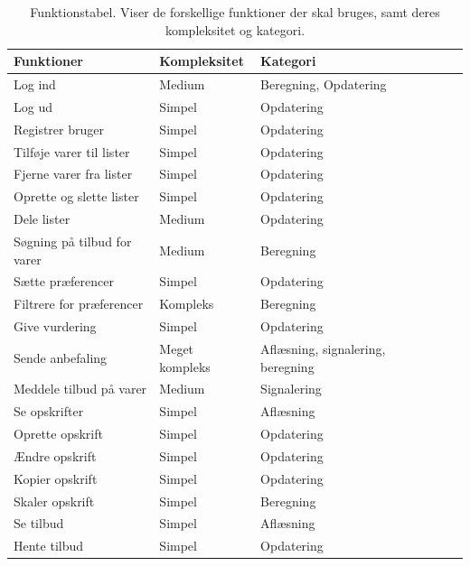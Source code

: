 \begin{table}[H]
  \centering
      \begin{tabular}{l|lllll}
      \textbf{Funktioner}			& {Kompleksitet}	& {Kategori}  	\\ \hline
      Log ind						& Medium			& Beregning, Opdatering		\\
      Log ud						& Simpel			& Opdatering	\\
      Registrer bruger				& Simpel			& Opdatering	\\
      Tilføje varer til lister		& Simpel       		& Opdatering	\\
      Fjerne varer fra lister		& Simpel       		& Opdatering	\\
      Oprette og slette lister		& Simpel       		& Opdatering	\\
      Dele lister					& Medium       		& Opdatering	\\
      Søgning på tilbud for varer   & Medium     		& Beregning		\\
      Sætte præferencer				& Simpel       		& Opdatering	\\
      Filtrere for præferencer		& Kompleks     		& Beregning		\\
      Give vurdering				& Simpel       		& Opdatering	\\
      Sende anbefaling				& Meget kompleks	& Aflæsning, signalering, beregning		\\
      Meddele tilbud på varer		& Medium      		& Signalering	\\
	  Se opskrifter					& Simpel       		& Aflæsning		\\
      Oprette opskrift      		& Simpel            & Opdatering  	\\
      Ændre opskrift        		& Simpel            & Opdatering	\\
      Kopier opskrift       		& Simpel            & Opdatering 	\\
      Skaler opskrift				& Simpel			& Beregning		\\
	  Se tilbud						& Simpel       		& Aflæsning		\\
      Hente tilbud					& Simpel	       	& Opdatering	\\
    \end{tabular}
  \caption{Funktionstabel. Viser de forskellige funktioner der skal bruges, samt deres kompleksitet og kategori.}\label{tabel:functionstable}
\end{table}

